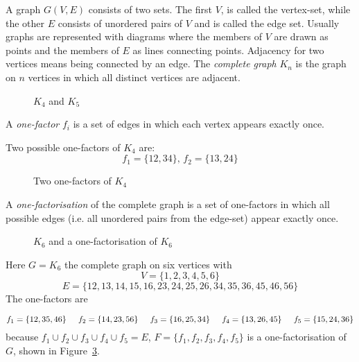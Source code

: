 A graph $G(V,E)$ consists of two sets.
The first $V$, is called the vertex-set, while the other $E$ consists of unordered pairs of $V$ and is called the edge set.
Usually graphs are represented with diagrams where the members of $V$ are drawn as points and the members of $E$ as lines connecting points.
Adjacency for two vertices means being connected by an edge.
The \emph{complete graph} $K_n$ is the graph on $n$ vertices in which all distinct vertices are adjacent.

\begin{figure}
  \centering
  
  \caption{$K_{4}$ and $K_{5}$}
  \label{fig:complete}
\end{figure}

A \emph{one-factor} $f_i$ is a set of edges in which each vertex appears exactly once.

\begin{example}
Two possible one-factors of $K_4$ are:
$$f_1 = \{12,34\},\, f_2 = \{13,24\}$$
\end{example}

\begin{figure}
  \centering
  
  \caption{Two one-factors of $K_{4}$}
  \label{fig:two-one-factors}
\end{figure}

A \emph{one-factorisation} of the complete graph is a set of one-factors in which all possible edges (i.e. all unordered pairs from the edge-set) appear exactly once.

\begin{figure}
  \centering
  
  \caption{$K_{6}$ and a one-factorisation of $K_{6}$}
  \label{fig:k6-factorisation}
\end{figure}

\begin{example}
Here
$G = K_6$
the complete graph on six vertices with
$$V = \{1, 2, 3, 4, 5, 6\}$$
$$E = \{12, 13, 14, 15, 16, 23, 24, 25, 26, 34, 35, 36, 45, 46, 56\}$$
The one-factors are

$$
f_1 = \{12, 35, 46\} \hspace{0.5cm}
f_2 = \{14, 23, 56\} \hspace{0.5cm}
f_3 = \{16, 25, 34\} \hspace{0.5cm}
f_4 = \{13, 26, 45\} \hspace{0.5cm} 
f_5 = \{15, 24, 36\}
$$
because
$f_1 \cup f_2 \cup f_3 \cup f_4 \cup f_5 = E$,
$F = \{f_1, f_2, f_3, f_4, f_5\}$
is a one-factorisation of
$G$,
shown in Figure~\ref{fig:k6-factorisation}.
\end{example}

